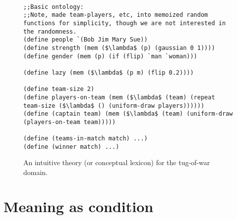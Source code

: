 \documentclass[12pt]{article}
\begin{document}
 
 
 \begin{figure}[htbp]
\begin{center}
 \begin{lstlisting}[mathescape]

;;Basic ontology: 
;;Note, made team-players, etc, into memoized random functions for simplicity, though we are not interested in the randomness.
(define people `(Bob Jim Mary Sue))
(define strength (mem ($\lambda$ (p) (gaussian 0 1))))
(define gender (mem (p) (if (flip) `man `woman)))

(define lazy (mem ($\lambda$ (p m) (flip 0.2))))

(define team-size 2)
(define players-on-team (mem ($\lambda$ (team) (repeat team-size ($\lambda$ () (uniform-draw players))))))
(define (captain team) (mem ($\lambda$ (team) (uniform-draw (players-on-team team)))))

(define (teams-in-match match) ...)
(define (winner match) ...)

\end{lstlisting}
\caption{An intuitive theory (or conceptual lexicon) for the tug-of-war domain.}
\label{theory}
\end{center}
\end{figure} 
 
 
 
\section{Meaning as condition}
 


\end{document}
